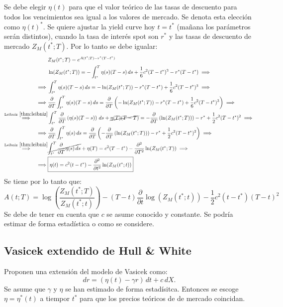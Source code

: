 Se debe elegir $\eta(t)$ para que el valor teórico de las tasas de descuento para todos los vencimientos sea igual a los valores de mercado. Se denota esta elección como $\eta(t)^*$. Se quiere ajustar la yield curve hoy $t=t^*$ (mañana los parámetros serán distintos), cuando la tasa de interés spot son $r^*$ y las tasas de descuento de mercado $Z_M(t^*;T)$. Por lo tanto se debe igualar:
\begin{align*}
    &Z_M(t^*;T) = e^{A(t^*;T) - r^*(T-t^*)} \\
    &\ln(Z_M(t^*;T)) = -\int_{t^*}^T \eta(s)(T-s)\,ds + \frac{1}{6}c^2(T-t^*)^3 - r^*(T-t^*) \implies \\
    \implies &\int_{t^*}^T \eta(s)(T-s)\,ds = -\ln(Z_M(t^*;T)) - r^*(T-t^*) + \frac{1}{6}c^2(T-t^*)^3 \implies \\
    \implies &\frac{\partial}{\partial T} \int_{t^*}^T \eta(s)(T-s)\,ds = \frac{\partial}{\partial T} \left( -\ln(Z_M(t^*;T)) - r^*(T-t^*) + \frac{1}{6}c^2(T-t^*)^3 \right) \implies \\
    \overset{\text{Leibniz}~\ref{thm:leibniz}}{\implies} &\int_{t^*}^T \frac{\partial}{\partial T}\left(\eta(s)(T-s)\right)\,ds + \cancel{\eta(T)(T-T)} = - \frac{\partial}{\partial T} \left(\ln(Z_M(t^*;T)) \right) - r^* + \frac{1}{2}c^2(T-t^*)^2 \implies \\
    \implies &\frac{\partial}{\partial T} \int_{t^*}^T \eta(s)\,ds = \frac{\partial}{\partial T} \left( -\frac{\partial}{\partial T} \left(\ln(Z_M(t^*;T)) \right) - r^* + \frac{1}{2}c^2(T-t^*)^2 \right) \implies \\
    \overset{\text{Leibniz}~\ref{thm:leibniz}}{\implies} &\cancel{\int_{t^*}^T \frac{\partial}{\partial T}\eta(s)\,ds} + \eta(T) = c^2(T-t^*) -\frac{\partial^2}{\partial T^2}\ln(Z_M(t^*;T)) \implies \\
    \implies &\boxed{\eta(t) = c^2(t-t^*) -\frac{\partial^2}{\partial t^2}\ln(Z_M(t^*;t))}
\end{align*}
Se tiene por lo tanto que:
\begin{equation*}
    \boxed{A(t; T) = \log\left(\frac{Z_M(t^*; T)}{Z_M(t^*; t)}\right) - (T-t)\frac{\partial}{\partial t}\log(Z_M(t^*; t)) - \frac{1}{2}c^2(t-t^*)(T-t)^2}
\end{equation*}
Se debe de tener en cuenta que $c$ se asume conocido y constante. Se podría estimar de forma estadística o como se considere.




\subsection{Vasicek extendido de Hull \& White}
Proponen una extensión del modelo de Vasicek como:
\begin{equation*}
    dr = (\eta(t) - \gamma r)\,dt + c\,dX.
\end{equation*}
Se asume que $\gamma$ y $\eta$ se han estimado de forma estadísitca. Entonces se escoge $\eta = \eta^*(t)$ a tiempor $t^*$ para que los precios teóricos de de mercado coincidan.

